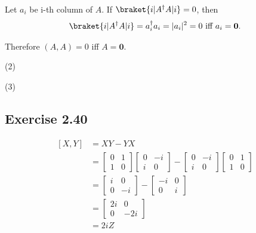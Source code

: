 \documentclass[a4paper,12pt]{article}
\begin{document}
Let $a_i$ be i-th column of $A$.
If $\braket{ i | A^\dagger A | i } = 0$, then
\begin{align*}
	\braket{ i | A^\dagger A | i } = a^\dagger_i a_i = |a_i|^2 = 0 \text{ iff }a_i = \mathbf{0}.
\end{align*}

Therefore $(A, A) = 0$ iff $A = \mathbf{0}$.

\vspace{5mm}
(2)

(3)


%
%

\subsection*{Exercise 2.40}
\begin{align*}
	\left[X, Y \right] &=XY - YX\\
		&= \begin{bmatrix}
		0 & 1 \\
		1 & 0
		\end{bmatrix}
		\begin{bmatrix}
		0 & -i \\
		i & 0
		\end{bmatrix}
		-
		\begin{bmatrix}
		0 & -i \\
		i & 0
		\end{bmatrix}
		\begin{bmatrix}
		0 & 1 \\
		1 & 0
		\end{bmatrix} \\
%
		&=
%
		\begin{bmatrix}
			i & 0 \\
			0 & -i
		\end{bmatrix}
		-
		\begin{bmatrix}
			-i & 0 \\
			0 & i
		\end{bmatrix}\\
%
		&=
%
		\begin{bmatrix}
			2i & 0 \\
			0 & -2i
		\end{bmatrix} \\
%
		&=	2i Z
\end{align*}
\end{document}
